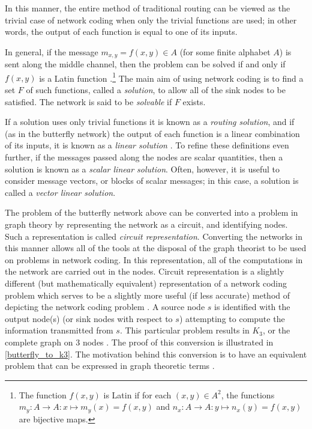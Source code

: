 In this manner, the entire method of traditional routing can be viewed as the trivial case of network coding when only the trivial functions are used; in other words, the output of each function is equal to one of its inputs.

\newpage

In general, if the message $m_{x, y} = f(x, y) \in A$ (for some finite alphabet $A$) is sent along the middle channel, then the problem can be solved if and only if $f(x, y)$ is a Latin function \cite{riah2004}.\footnote{The function $f(x, y)$ is Latin if for each $(x, y) \in A^2$, the functions $m_y : A \rightarrow A : x \mapsto m_y(x) = f(x, y)$ and $n_x : A \rightarrow A : y \mapsto n_x(y) = f(x, y)$ are bijective maps.} The main aim of using network coding is to find a set $F$ of such functions, called a \emph{solution}, to allow all of the sink nodes to be satisfied. The network is said to be \emph{solvable} if $F$ exists.

If a solution uses only trivial functions it is known as a \emph{routing solution}, and if (as in the butterfly network) the output of each function is a linear combination of its inputs, it is known as a \emph{linear solution} \cite{cann2006}. To refine these definitions even further, if the messages passed along the nodes are scalar quantities, then a solution is known as a \emph{scalar linear solution}. Often, however, it is useful to consider message vectors, or blocks of scalar messages; in this case, a solution is called a \emph{vector linear solution}.

The problem of the butterfly network above can be converted into a problem in graph theory by representing the network as a circuit, and identifying nodes. Such a representation is called \emph{circuit representation}. Converting the networks in this manner allows all of the tools at the disposal of the graph theorist to be used on problems in network coding. In this representation, all of the computations in the network are carried out in the nodes. Circuit representation is a slightly different (but mathematically equivalent) representation of a network coding problem which serves to be a slightly more useful (if less accurate) method of depicting the network coding problem \cite{riis2005util}. A source node $s$ is identified with the output node(s) (or sink nodes with respect to $s$) attempting to compute the information transmitted from $s$. This particular problem results in $K_3$, or the complete graph on $3$ nodes \cite{riis2005util}. The proof of this conversion is illustrated in \autoref{butterfly_to_k3}. The motivation behind this conversion is to have an equivalent problem that can be expressed in graph theoretic terms \cite{riis2005util, riis2005info}.

